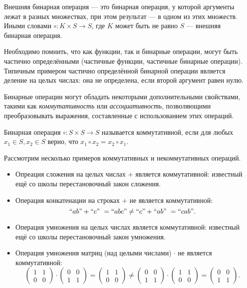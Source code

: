 \begin{definition}
Внешняя бинарная операция --- это бинарная операция, у которой аргументы лежат в разных множествах, при этом результат --- в одном из этих множеств. Иными словами $\circ: K \times S \to S$, где $K$ может быть не равно $S$  --- внешняя бинарная операция.
\end{definition}


Необходимо помнить, что как функции, так и бинарные операции, могут быть частично определёнными (частичные функции, частичные бинарные операции). Типичным примером частично определённой бинарной операции является деление на целых числах: она не определена, если второй аргумент равен нулю.


Бинарные операции могут обладать некоторыми дополнительными свойствами, такими как \textit{коммутативность} или \textit{ассоциативность}, позволяющими преобразовывать выражения, составленные с использованием этих операций.


\begin{definition}[Коммутативность]
Бинарная операция $\circ : S \times S \to S$ называется коммутативной, если для любых  $x_1 \in S, x_2 \in S$ верно, что  $x_1 \circ x_2 = x_2 \circ x_1$.
\end{definition}

\begin{example} Рассмотрим несколько примеров коммутативных и некоммутативных операций.
	\begin{itemize}
		\item Опреация сложения на целых числах $+$ является коммутативной: известный ещё со школы перестановочный закон сложения.
		\item Операция конкатенации на строках $+$ не является коммутативной: $$``ab" + ``c" \ = ``abc" \neq ``c" + ``ab" \ = ``cab".$$
		\item Операция умножения на целых числах является коммутативной: известный ещё со школы перестановочный закон умножения.
		\item Операция умножения матриц (над целыми числами) $\cdot$ не является коммутативной:
		$$\begin{pmatrix} 
		1 & 1 \\ 0 & 0
		\end{pmatrix}
		\cdot
		\begin{pmatrix} 
		0 & 0 \\ 1 & 1
		\end{pmatrix}
		=
		\begin{pmatrix} 
		1 & 1 \\ 0 & 0
		\end{pmatrix}
		\neq
		\begin{pmatrix} 
		0 & 0 \\ 1 & 1
		\end{pmatrix}
		\cdot
		\begin{pmatrix} 
		1 & 1 \\ 0 & 0
		\end{pmatrix}
		=
		\begin{pmatrix} 
		0 & 0 \\ 1 & 1
		\end{pmatrix}
		.$$
	\end{itemize}
\end{example}

